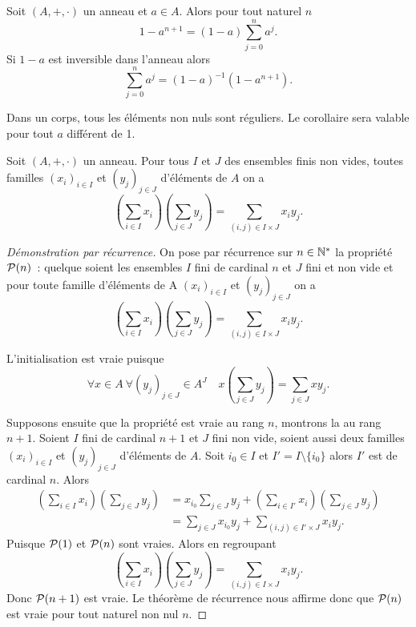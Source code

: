 \begin{corth}
  Soit $(A,+,\cdot)$ un anneau et $a \in A$. Alors pour tout naturel $n$
  \begin{equation}
    1-a^{n+1}=(1-a)\sum_{j=0}^n a^j.
  \end{equation}
  Si $1-a$ est inversible dans l'anneau alors
  \begin{equation}
    \sum_{j=0}^n a^j = (1-a)^{-1}(1-a^{n+1}).
  \end{equation}
\end{corth}
Dans un corps, tous les éléments non nuls sont réguliers. Le corollaire sera valable pour tout $a$ différent de 1.

\begin{theo}
  Soit $(A,+,\cdot)$ un anneau. Pour tous $I$ et $J$ des ensembles finis non vides, toutes familles $(x_i)_{i \in I}$ et $(y_j)_{j \in J}$ d'éléments de $A$ on a
  \begin{equation}
    \left(\sum_{i \in I} x_i \right)\left(\sum_{j \in J} y_j \right) = \sum_{(i,j)\in I\times J} x_iy_j.
  \end{equation}
\end{theo}
\begin{proof}[Démonstration par récurrence]
  On pose par récurrence sur $n \in \N^*$ la propriété $\P(n)$~: quelque soient les ensembles $I$ fini de cardinal $n$ et $J$ fini et non vide et pour toute famille d'éléments de A $(x_i)_{i \in I}$ et $(y_j)_{j \in J}$ on a
\begin{equation} 
  \left(\sum_{i \in I} x_i \right)\left(\sum_{j \in J} y_j \right) = \sum_{(i,j)\in I\times J} x_iy_j.
\end{equation}

L'initialisation est vraie puisque
\begin{equation}
  \forall x \in A \ \forall (y_j)_{j \in J} \in A^J \quad x \left(\sum_{j \in J} y_j \right) = \sum_{j \in J} xy_j.
\end{equation}

Supposons ensuite que la propriété est vraie au rang $n$, montrons la au rang $n+1$. Soient $I$ fini de cardinal $n+1$ et $J$ fini non vide, soient aussi deux familles $(x_i)_{i \in I}$ et $(y_j)_{j \in J}$ d'éléments de $A$. Soit $i_0 \in I$ et $I'=I\setminus\{i_0\}$ alors $I'$ est de cardinal $n$. Alors
\begin{align}
  \left(\sum_{i \in I} x_i \right)\left(\sum_{j \in J} y_j \right) &=x_{i_0} \sum_{j \in J} y_j + \left(\sum_{i \in I'} x_i \right)\left(\sum_{j \in J} y_j \right) \\
&=\sum_{j \in J} x_{i_0}y_j +  \sum_{(i,j)\in I'\times J} x_iy_j.
\end{align}
Puisque $\P(1)$ et $\P(n)$ sont vraies. Alors en regroupant
\begin{equation}
  \left(\sum_{i \in I} x_i \right)\left(\sum_{j \in J} y_j \right) = \sum_{(i,j)\in I\times J} x_iy_j.
\end{equation}
Donc $\P(n+1)$ est vraie. Le théorème de récurrence nous affirme donc que $\P(n)$ est vraie pour tout naturel non nul $n$.
\end{proof}

